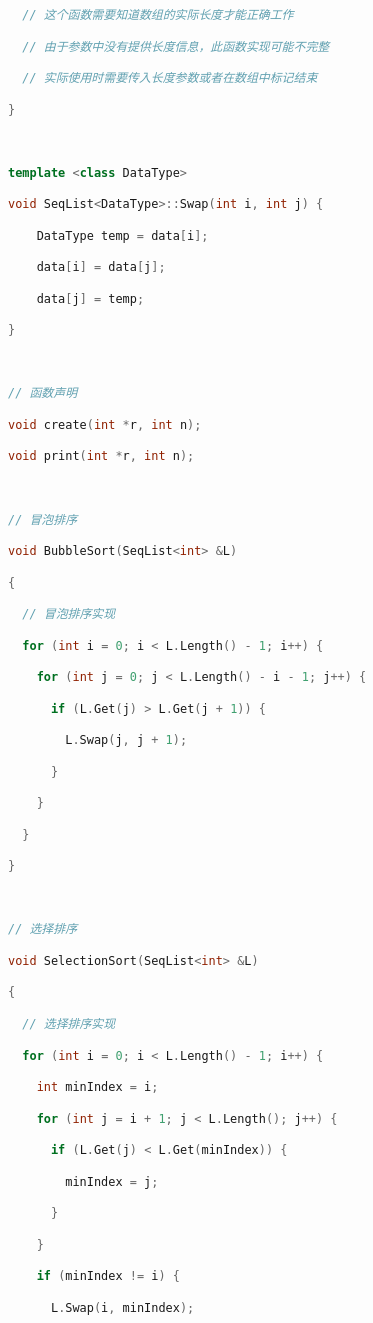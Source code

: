 \begin{lstlisting}[language=C++]
  // 这个函数需要知道数组的实际长度才能正确工作

  // 由于参数中没有提供长度信息，此函数实现可能不完整

  // 实际使用时需要传入长度参数或者在数组中标记结束

}

  

template <class DataType>

void SeqList<DataType>::Swap(int i, int j) {

    DataType temp = data[i];

    data[i] = data[j];

    data[j] = temp;

}

  

// 函数声明

void create(int *r, int n);

void print(int *r, int n);

  

// 冒泡排序

void BubbleSort(SeqList<int> &L)

{

  // 冒泡排序实现

  for (int i = 0; i < L.Length() - 1; i++) {

    for (int j = 0; j < L.Length() - i - 1; j++) {

      if (L.Get(j) > L.Get(j + 1)) {

        L.Swap(j, j + 1);

      }

    }

  }

}

  

// 选择排序

void SelectionSort(SeqList<int> &L)

{

  // 选择排序实现

  for (int i = 0; i < L.Length() - 1; i++) {

    int minIndex = i;

    for (int j = i + 1; j < L.Length(); j++) {

      if (L.Get(j) < L.Get(minIndex)) {

        minIndex = j;

      }

    }

    if (minIndex != i) {

      L.Swap(i, minIndex);


\end{lstlisting}
